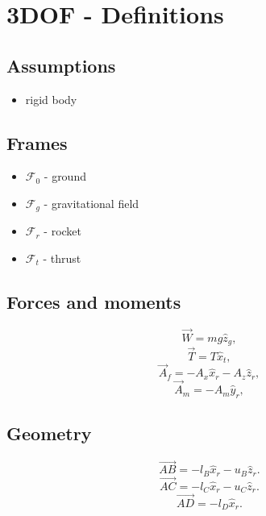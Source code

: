 \documentclass[10pt]{extarticle}
\numberwithin{equation}{subsection}
\begin{document}
\section{3DOF - Definitions}

\subsection{Assumptions}
\begin{itemize}
    \item rigid body
\end{itemize}

\subsection{Frames}
\begin{itemize}
    \item $\mathcal{F}_0$ - ground
    \item $\mathcal{F}_g$ - gravitational field
    \item $\mathcal{F}_r$ - rocket
    \item $\mathcal{F}_t$ - thrust 
\end{itemize}


\subsection{Forces and moments}
\begin{equation}
    \vec{W} = mg\hat{z}_g, 
\end{equation}
\begin{equation}
    \vec{T} = T\hat{x}_t,
\end{equation}
\begin{equation}
    \vec{A}_f = -A_x\hat{x}_r - A_z\hat{z}_r,
\end{equation}
\begin{equation}
    \vec{A}_m = -A_m\hat{y}_r,
\end{equation}

\subsection{Geometry}
\begin{equation}
    \vec{AB} = -l_B\hat{x}_r - u_B\hat{z}_r.
\end{equation}
\begin{equation}
    \vec{AC} = -l_C\hat{x}_r - u_C\hat{z}_r.
\end{equation}
\begin{equation}
    \vec{AD} = -l_D\hat{x}_r.
\end{equation}
\end{document}
